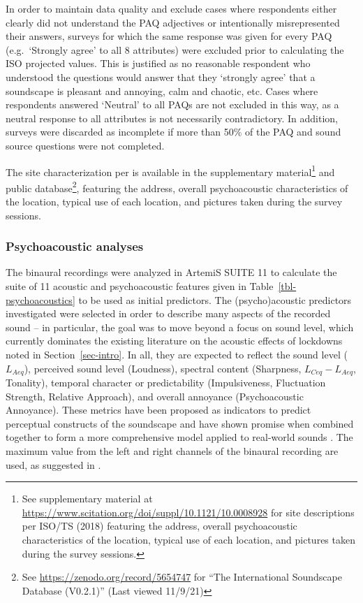 \documentclass[
  authoryear,
  preprint,
  3p,
  onecolumn]{elsarticle}
\begin{document}
In order to maintain data quality and exclude cases where respondents
either clearly did not understand the PAQ adjectives or intentionally
misrepresented their answers, surveys for which the same response was
given for every PAQ (e.g.~`Strongly agree' to all 8 attributes) were
excluded prior to calculating the ISO projected values. This is
justified as no reasonable respondent who understood the questions would
answer that they `strongly agree' that a soundscape is pleasant and
annoying, calm and chaotic, etc. Cases where respondents answered
`Neutral' to all PAQs are not excluded in this way, as a neutral
response to all attributes is not necessarily contradictory. In
addition, surveys were discarded as incomplete if more than 50\% of the
PAQ and sound source questions were not completed.

The site characterization per \citet{ISO12913Part2} is available in the
supplementary material\footnote{See supplementary material at
  \url{https://www.scitation.org/doi/suppl/10.1121/10.0008928} for site
  descriptions per ISO/TS (2018) featuring the address, overall
  psychoacoustic characteristics of the location, typical use of each
  location, and pictures taken during the survey sessions.} and public
database\footnote{See \url{https://zenodo.org/record/5654747} for ``The
  International Soundscape Database (V0.2.1)'' (Last viewed 11/9/21)},
featuring the address, overall psychoacoustic characteristics of the
location, typical use of each location, and pictures taken during the
survey sessions.

\hypertarget{sec-psychoacousticAnalysis}{%
\subsubsection{Psychoacoustic
analyses}\label{sec-psychoacousticAnalysis}}

The binaural recordings were analyzed in ArtemiS SUITE 11 to calculate
the suite of 11 acoustic and psychoacoustic features given in
Table~\ref{tbl-psychoacoustics} to be used as initial predictors. The
(psycho)acoustic predictors investigated were selected in order to
describe many aspects of the recorded sound -- in particular, the goal
was to move beyond a focus on sound level, which currently dominates the
existing literature on the acoustic effects of lockdowns noted in
Section~\ref{sec-intro}. In all, they are expected to reflect the sound
level (\(L_{Aeq}\)), perceived sound level (Loudness), spectral content
(Sharpness, \(L_{Ceq}-L_{Aeq}\), Tonality), temporal character or
predictability (Impulsiveness, Fluctuation Strength, Relative Approach),
and overall annoyance (Psychoacoustic Annoyance). These metrics have
been proposed as indicators to predict perceptual constructs of the
soundscape \citep{Aletta2016Soundscape, Aletta2017Dimensions} and have
shown promise when combined together to form a more comprehensive model
applied to real-world sounds \citep{Orga2021Multilevel}. The maximum
value from the left and right channels of the binaural recording are
used, as suggested in \citet{ISO12913Part3}.
\end{document}
